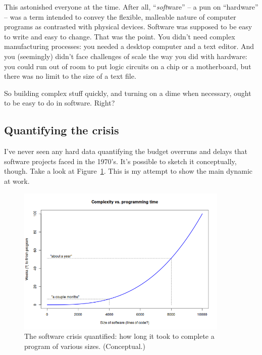 This astonished everyone at the time. After all, ``\textit{soft}ware'' -- a
pun on ``hardware'' -- was a term intended to convey the flexible, malleable
nature of computer programs as contrasted with physical devices. Software was
supposed to be easy to write and easy to change. That was the point. You
didn't need complex manufacturing processes: you needed a desktop computer and
a text editor. And you (seemingly) didn't face challenges of scale the way you
did with hardware: you could run out of room to put logic circuits on a chip
or a motherboard, but there was no limit to the size of a text file. 

So building complex stuff quickly, and turning on a dime when necessary, ought
to be easy to do in software. Right?

\subsection{Quantifying the crisis}

I've never seen any hard data quantifying the budget overruns and delays that
software projects faced in the 1970's. It's possible to sketch it
conceptually, though. Take a look at Figure~\ref{fig:complexityCurve}. This is
my attempt to show the main dynamic at work.

\begin{figure}[ht]
\centering
\includegraphics[width=0.9\textwidth]{complexityCurve.png}
\caption{The software crisis quantified: how long it took to complete a
program of various sizes. (Conceptual.)}
\label{fig:complexityCurve}
\end{figure}

